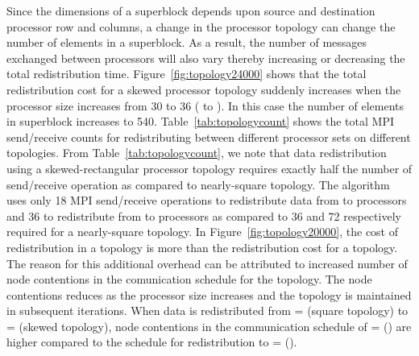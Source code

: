 \documentclass[letterpaper]{llncs}
\begin{document}
\vspace{-0.03in}
Since the dimensions of a superblock depends upon source and destination processor row and columns, a change in the processor topology can change the number of elements in a superblock. As a result, the number of messages exchanged between processors will also vary thereby increasing or decreasing
the total redistribution time. 
Figure~\ref{fig:topology24000} shows that the total redistribution cost for a skewed processor topology suddenly increases 
when the processor size increases from 30 to 36 ( to ).
In this case the number of elements in superblock increases to 540.
Table~\ref{tab:topologycount}  shows the total MPI send/receive counts for redistributing between different processor sets on different topologies. 
From Table~\ref{tab:topologycount},
we note that data redistribution using a skewed-rectangular processor topology 
requires exactly half the number of send/receive operation as compared to 
nearly-square 
topology. The algorithm uses only 18 MPI send/receive operations to 
redistribute data from  to   processors and 36 to redistribute from 
 to  processors as compared to 36 and 72 respectively required 
for a nearly-square topology.
In Figure~\ref{fig:topology20000}, the cost of redistribution in a   topology is more than the redistribution cost for a  topology. The reason for this additional overhead can be attributed to increased number of node contentions in the comunication schedule for the  topology.  
The node contentions reduces as the processor size increases and the topology is maintained in subsequent iterations. When data is redistributed from  =  (square topology) to  =  (skewed topology), 
 node contentions in the communication schedule of  =  () are higher compared to the schedule for redistribution to  =  ().
\end{document}
